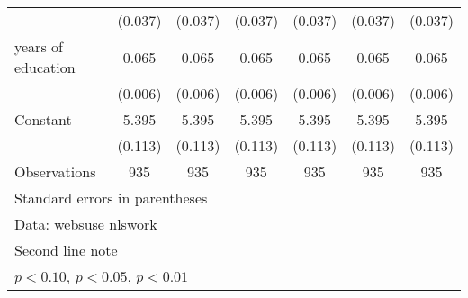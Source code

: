 \begin{table}[htbp]
\begin{tabular}{l*{6}{c}}
                    &     (0.037)         &     (0.037)         &     (0.037)         &     (0.037)         &     (0.037)         &     (0.037)         \\
\addlinespace
years of education  &       0.065\sym{***}&       0.065\sym{***}&       0.065\sym{***}&       0.065\sym{***}&       0.065\sym{***}&       0.065\sym{***}\\
                    &     (0.006)         &     (0.006)         &     (0.006)         &     (0.006)         &     (0.006)         &     (0.006)         \\
\addlinespace
Constant            &       5.395\sym{***}&       5.395\sym{***}&       5.395\sym{***}&       5.395\sym{***}&       5.395\sym{***}&       5.395\sym{***}\\
                    &     (0.113)         &     (0.113)         &     (0.113)         &     (0.113)         &     (0.113)         &     (0.113)         \\
\midrule
Observations        &         935         &         935         &         935         &         935         &         935         &         935         \\
\bottomrule
\multicolumn{7}{l}{\footnotesize Standard errors in parentheses}\\
\multicolumn{7}{l}{\footnotesize Data: websuse nlswork}\\
\multicolumn{7}{l}{\footnotesize Second line note}\\
\multicolumn{7}{l}{\footnotesize \sym{*} \(p<0.10\), \sym{**} \(p<0.05\), \sym{***} \(p<0.01\)}\\
\end{tabular}
\end{table}
